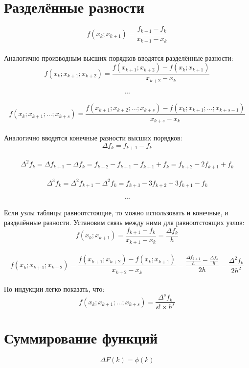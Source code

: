 \documentclass[a4paper,11pt]{article}
\begin{document}
\section{Разделённые разности}
\[f(x_k; x_{k+1}) = \frac{f_{k+1} - f_k}{x_{k+1} - x_k}\] \\
Аналогично производным высших порядков вводятся разделённые разности: \\
\[f(x_k; x_{k+1}; x_{k+2}) = \frac{f(x_{k+1}; x_{k+2}) - f(x_k; x_{k+1})}{x_{k+2} - x_k}\] \\
\[\dots\] \\
\[f(x_k; x_{k+1}; \dots; x_{k+s}) = \frac{f(x_{k+1}; x_{k+2}; \dots; x_{k+s})
    - f(x_k; x_{k+1}; \dots; x_{k+s-1})}{x_{k+s} - x_k}\] \\
Аналогично вводятся конечные разности высших порядков: \\
\[\Delta f_k = f_{k+1} - f_k\] \\
\[\Delta^2 f_k = \Delta f_{k+1} - \Delta f_k = f_{k+2} - f_{k+1} - f_{k+1} + f_k = f_{k+2} - 2f_{k+1} + f_k\] \\
\[\Delta^3 f_k = \Delta^2 f_{k+1} - \Delta^2 f_k = f_{k+3} - 3f_{k+2} + 3f_{k+1} - f_k\] \\
\[\dots\] \\
Если узлы таблицы равноотстоящие, то можно использовать и конечные, и разделённые разности.
Установим связь между ними для равноотстоящих узлов: \\
\[f(x_k; x_{k+1}) = \frac{f_{k+1} - f_k}{x_{k+1} - x_k} = \frac{\Delta f_k}{h}\] \\
\[f(x_k; x_{k+1}; x_{k+2}) = \frac{f(x_{k+1}; x_{k+2}) - f(x_k; x_{k+1})}{x_{k+2} - x_k}
    = \frac{\frac{\Delta f_{k+1}}{h} - \frac{\Delta f_k}{h}}{2h} = \frac{\Delta^2 f_k}{2h^2}\] \\
По индукции легко показать, что: \\
\[f(x_k; x_{k+1}; \dots; x_{k+s}) = \frac{\Delta^s f_k}{s! \times h^s}\]
\newpage

\section{Суммирование функций}
\begin{equation}
  \Delta F(k) = \phi(k)
\end{equation}



\newpage
\end{document}
